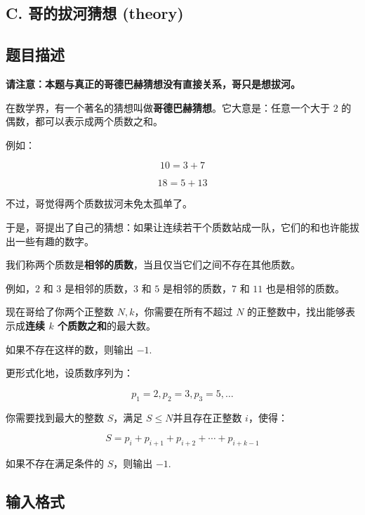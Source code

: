 
\begin{center}
    \section{C. 哥的拔河猜想 (theory)}
\end{center}

\subsection{题目描述}


\textbf{请注意：本题与真正的哥德巴赫猜想没有直接关系，哥只是想拔河。}

在数学界，有一个著名的猜想叫做\textbf{哥德巴赫猜想}。它大意是：任意一个大于 $2$ 的偶数，都可以表示成两个质数之和。

例如：

$$
10=3+7
$$

$$
18=5+13
$$

不过，哥觉得两个质数拔河未免太孤单了。

于是，哥提出了自己的猜想：如果让连续若干个质数站成一队，它们的和也许能拔出一些有趣的数字。

我们称两个质数是\textbf{相邻的质数}，当且仅当它们之间不存在其他质数。

例如，$2$ 和 $3$ 是相邻的质数，$3$ 和 $5$ 是相邻的质数，$7$ 和 $11$ 也是相邻的质数。

现在哥给了你两个正整数 $N,k$，你需要在所有不超过 $N$ 的正整数中，找出能够表示成\textbf{连续 $k$ 个质数之和}的最大数。

如果不存在这样的数，则输出 $-1$.

更形式化地，设质数序列为：

$$
p_1=2,p_2=3,p_3=5,\dots
$$

你需要找到最大的整数 $S$，满足 $S\le N$并且存在正整数 $i$，使得：

$$
S=p_i+p_{i+1}+p_{i+2}+\cdots+p_{i+k-1}
$$

如果不存在满足条件的 $S$，则输出 $-1$.

\subsection{输入格式}

